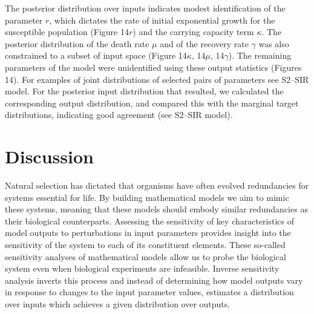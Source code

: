\documentclass[10pt,letterpaper]{article}
\begin{document}
The posterior distribution over inputs indicates modest identification of the parameter $r$, which dictates the rate of initial exponential growth for the susceptible population (Figure 14$r$) and the carrying capacity term $\kappa$.
The posterior distribution of the death rate $\mu$ and of the recovery rate $\gamma$ was also constrained to a subset of input space (Figure 14$\kappa$, 14$\mu$, 14$\gamma$). The remaining parameters of the model were unidentified using these output statistics (Figures 14). For examples of joint distributions of selected pairs of parameters see S2--SIR model. For the posterior input distribution that resulted, we calculated the corresponding output distribution, and compared this with the marginal target distributions, indicating good agreement (see S2--SIR model).




\section{Discussion}
\label{sec:discussion}

Natural selection has dictated that organisms have often evolved redundancies for systems essential for life. By building mathematical models we aim to mimic these systems, meaning that these models should embody similar redundancies as their biological counterparts. Assessing the sensitivity of key characteristics of model outputs to perturbations in input parameters provides insight into the sensitivity of the system to each of its constituent elements. These so-called sensitivity analyses of mathematical models allow us to probe the biological system even when biological experiments are infeasible. Inverse sensitivity analysis inverts this process and instead of determining how model outputs vary in response to changes to the input parameter values, estimates a distribution over inputs which achieves a given distribution over outputs.
\end{document}
